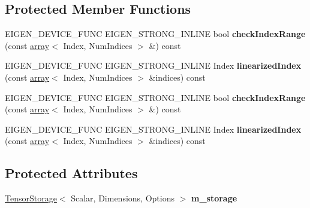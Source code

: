 \subsection*{Protected Member Functions}
\begin{DoxyCompactItemize}
\item 
\mbox{\label{class_eigen_1_1_tensor_fixed_size_ad46d72e55a8eb94256c02361d9f6047c}} 
E\+I\+G\+E\+N\+\_\+\+D\+E\+V\+I\+C\+E\+\_\+\+F\+U\+NC E\+I\+G\+E\+N\+\_\+\+S\+T\+R\+O\+N\+G\+\_\+\+I\+N\+L\+I\+NE bool {\bfseries check\+Index\+Range} (const \hyperlink{class_eigen_1_1array}{array}$<$ Index, Num\+Indices $>$ \&) const
\item 
\mbox{\label{class_eigen_1_1_tensor_fixed_size_adb982d78883b4f5a1c2787297419c8d4}} 
E\+I\+G\+E\+N\+\_\+\+D\+E\+V\+I\+C\+E\+\_\+\+F\+U\+NC E\+I\+G\+E\+N\+\_\+\+S\+T\+R\+O\+N\+G\+\_\+\+I\+N\+L\+I\+NE Index {\bfseries linearized\+Index} (const \hyperlink{class_eigen_1_1array}{array}$<$ Index, Num\+Indices $>$ \&indices) const
\item 
\mbox{\label{class_eigen_1_1_tensor_fixed_size_ad46d72e55a8eb94256c02361d9f6047c}} 
E\+I\+G\+E\+N\+\_\+\+D\+E\+V\+I\+C\+E\+\_\+\+F\+U\+NC E\+I\+G\+E\+N\+\_\+\+S\+T\+R\+O\+N\+G\+\_\+\+I\+N\+L\+I\+NE bool {\bfseries check\+Index\+Range} (const \hyperlink{class_eigen_1_1array}{array}$<$ Index, Num\+Indices $>$ \&) const
\item 
\mbox{\label{class_eigen_1_1_tensor_fixed_size_adb982d78883b4f5a1c2787297419c8d4}} 
E\+I\+G\+E\+N\+\_\+\+D\+E\+V\+I\+C\+E\+\_\+\+F\+U\+NC E\+I\+G\+E\+N\+\_\+\+S\+T\+R\+O\+N\+G\+\_\+\+I\+N\+L\+I\+NE Index {\bfseries linearized\+Index} (const \hyperlink{class_eigen_1_1array}{array}$<$ Index, Num\+Indices $>$ \&indices) const
\end{DoxyCompactItemize}
\subsection*{Protected Attributes}
\begin{DoxyCompactItemize}
\item 
\mbox{\label{class_eigen_1_1_tensor_fixed_size_aaa3ef6aa599835faa6919ccb83646bca}} 
\hyperlink{class_eigen_1_1_tensor_storage}{Tensor\+Storage}$<$ Scalar, Dimensions, Options $>$ {\bfseries m\+\_\+storage}
\end{DoxyCompactItemize}


